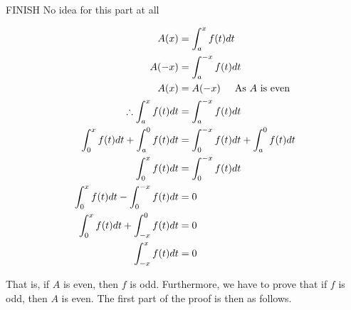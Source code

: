 		FINISH No idea for this part at all







		\begin{align*}
		A(x) & = \int_{a}^{x}f(t)dt\\
		A(-x) & = \int_{a}^{-x}f(t)dt\\
		A(x) & = A(-x) \hspace{5mm} \text{As $\displaystyle{A}$ is even}\\
		\therefore \int_{a}^{x}f(t)dt & = \int_{a}^{-x}f(t)dt\\
		\int_{0}^{x}f(t)dt + \int_{a}^{0}f(t)dt & = \int_{0}^{-x}f(t)dt + \int_{a}^{0}f(t)dt\\
		\int_{0}^{x}f(t)dt & = \int_{0}^{-x}f(t)dt\\
		\int_{0}^{x}f(t)dt - \int_{0}^{-x}f(t)dt & = 0\\
		\int_{0}^{x}f(t)dt + \int_{-x}^{0}f(t)dt & = 0\\
		\int_{-x}^{x}f(t)dt & = 0\\
		\end{align*}




		That is, if $\displaystyle{A}$ is even, then $\displaystyle{f}$ is odd. Furthermore, we have to prove that if $\displaystyle{f}$ is odd, then $\displaystyle{A}$ is even. The first part of the proof is then as follows.